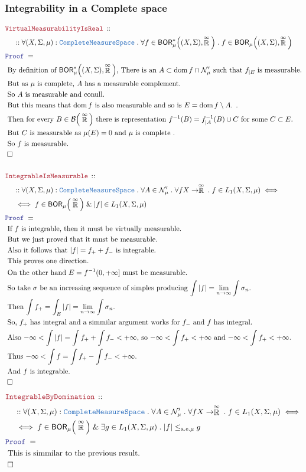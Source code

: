 \documentclass[12pt]{scrartcl}
\newcommand{\TYPE}[1]{\textcolor{NavyBlue}{\mathtt{#1}}}
\newcommand{\LOGIC}[1]{\textcolor{Blue}{\mathtt{#1}}}
\newcommand{\THM}[1]{\textcolor{Maroon}{\mathtt{#1}}}
\renewcommand{\.}{\; . \;}
\newcommand{\Theorem}[2]{& \THM{#1} \, :: \, #2 \\ & \Proof = \\ }
\newcommand{\NewLine}{\\ & \kern 1pc}
\newcommand{\Page}[1]{ \begin{align*} #1 \end{align*}   }
\renewcommand{\And}{\; \& \;}
\newcommand{\EReals}{\stackrel{\mathclap{\infty}}{\mathbb{R}}}
\newcommand{\QED}{\; \square}
\newcommand{\EndProof}{& \QED \\}
\newcommand{\Proof}{\LOGIC{Proof} \; }
\newcommand{\Explain}[1]{& \text{#1.} \\}
\DeclareMathOperator*{\dom}{dom}
\newcommand{\B}{\mathcal{B}}
\newcommand{\BOR}{\mathsf{BOR}}
\newcommand{\CMS}{\TYPE{CompleteMeasureSpace}}
\newcommand{\Null}{\mathcal{N}}
\renewcommand{\ae}{\mathrm{a.e.}}
\begin{document}
\subsubsection{Integrability in a Complete space}
\Page{
	\Theorem{VirtualMeasurabilityIsReal}
	{
		\NewLine ::		
		\forall (X,\Sigma,\mu) : \CMS \.
		\forall f \in \BOR_\mu^*\Big((X,\Sigma),\EReals\Big) \.
		f \in \BOR_\mu\Big((X,\Sigma),\EReals\Big)
	}
	\Explain{
		By definition of $\BOR_\mu^*\Big((X,\Sigma),\EReals\Big)$, 
		There is an $A \subset \dom f \cap \Null'_\mu$
		such that $f_{|E}$ is measurable}
	\Explain{
		But as $\mu$ is complete, $A$ has a measurable complement}
	\Explain{
		So $A$ is measurable and conull}
	\Explain{
		But this means that $\dom f$ is also measurable and so is $E  = \dom f \setminus A$.
	}
	\Explain{
		Then for every $B \in \B\Big(\EReals\Big)$ there is representation 
		$f^{-1}(B) = f^{-1}_{|A}(B) \cup C$		
		for some $C \subset E$}
	\Explain{
		But $C$ is measurable as $\mu(E) = 0$ and $\mu$ is complete 
	}
	\Explain{
		So $f$ is measurable}
	\EndProof
	\\
	\Theorem{IntegrableIsMeasurable}
	{
		\NewLine ::
		\forall (X,\Sigma,\mu) : \CMS \.
		\forall A \in \Null'_\mu \. 
		\forall f X \to \EReals \.
		f \in L_1(X,\Sigma,\mu) 
		\iff \NewLine \iff
		f \in \BOR_\mu\Big( \EReals  \Big)
		\And
		|f| \in L_1(X,\Sigma,\mu)
	}
	\Explain{
		If $f$ is integrable, then it must be virtually measurable}
	\Explain{
		But we just proved that it 	must be measurable}
	\Explain{
		Also it follows that $|f| = f_+ + f_-$ is integrable}
	\Explain{
		This proves one direction}
	\Explain{ 
		On the other hand $E = f^{-1}(0,+\infty]$ must be measurable}
	\Explain{
		So take $\sigma$ be an increasing sequence of simples producing $\int |f| = \lim_{n\to \infty} \int \sigma_n$}
	\Explain{
		Then $\int f_+  = \int_E |f| = \lim_{n\to \infty} \int \sigma_n$}
	\Explain{
		So, $f_+$ has integral and a simmilar argument works for $f_-$ and $f$ has integral}
	\Explain{
		Also $-\infty < \int |f| = \int f_+ + \int f_- < + \infty$, 
		so	$-\infty <  \int f_+ < + \infty$ and $-\infty <  \int f_+ < + \infty$}
	\Explain{
		Thus $-\infty < \int f = \int f_+ - \int f_- < + \infty$}
	\Explain{
		And $f$ is integrable}
	\EndProof
}\Page{
	\Theorem{IntegrableByDomination}
	{
		\NewLine ::
		\forall (X,\Sigma,\mu) : \CMS \.
		\forall A \in \Null'_\mu \. 
		\forall f X \to \EReals \.
		f \in L_1(X,\Sigma,\mu) 
		\iff \NewLine \iff
		f \in \BOR_\mu\Big( \EReals  \Big)
		\And
		\exists g \in L_1(X,\Sigma,\mu) \. 
		|f| \le_{\ae \mu} g
	}
	\Explain{
		 This is simmilar to the previous result}
	\EndProof
}
\newpage
\end{document}
